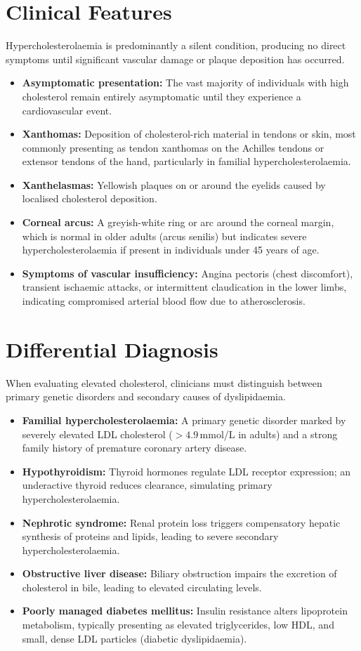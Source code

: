 \section*{Clinical Features}
Hypercholesterolaemia is predominantly a silent condition, producing no direct symptoms until significant vascular damage or plaque deposition has occurred.
\begin{itemize}
    \item \textbf{Asymptomatic presentation:} The vast majority of individuals with high cholesterol remain entirely asymptomatic until they experience a cardiovascular event.
    \item \textbf{Xanthomas:} Deposition of cholesterol-rich material in tendons or skin, most commonly presenting as tendon xanthomas on the Achilles tendons or extensor tendons of the hand, particularly in familial hypercholesterolaemia.
    \item \textbf{Xanthelasmas:} Yellowish plaques on or around the eyelids caused by localised cholesterol deposition.
    \item \textbf{Corneal arcus:} A greyish-white ring or arc around the corneal margin, which is normal in older adults (arcus senilis) but indicates severe hypercholesterolaemia if present in individuals under 45 years of age.
    \item \textbf{Symptoms of vascular insufficiency:} Angina pectoris (chest discomfort), transient ischaemic attacks, or intermittent claudication in the lower limbs, indicating compromised arterial blood flow due to atherosclerosis.
\end{itemize}

\section*{Differential Diagnosis}
When evaluating elevated cholesterol, clinicians must distinguish between primary genetic disorders and secondary causes of dyslipidaemia.
\begin{itemize}
    \item \textbf{Familial hypercholesterolaemia:} A primary genetic disorder marked by severely elevated LDL cholesterol ($>4.9$\,mmol/L in adults) and a strong family history of premature coronary artery disease.
    \item \textbf{Hypothyroidism:} Thyroid hormones regulate LDL receptor expression; an underactive thyroid reduces clearance, simulating primary hypercholesterolaemia.
    \item \textbf{Nephrotic syndrome:} Renal protein loss triggers compensatory hepatic synthesis of proteins and lipids, leading to severe secondary hypercholesterolaemia.
    \item \textbf{Obstructive liver disease:} Biliary obstruction impairs the excretion of cholesterol in bile, leading to elevated circulating levels.
    \item \textbf{Poorly managed diabetes mellitus:} Insulin resistance alters lipoprotein metabolism, typically presenting as elevated triglycerides, low HDL, and small, dense LDL particles (diabetic dyslipidaemia).
\end{itemize}

